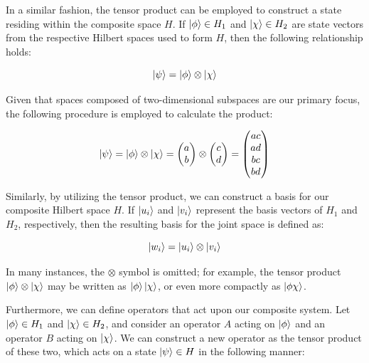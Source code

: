 \documentclass[en]{dimscthesis}
\begin{document}
In a similar fashion, the tensor product can be employed to construct a state residing within the composite space $H$. If $\ket{\phi} \in H_1$ and $\ket{\chi} \in H_2$ are state vectors from the respective Hilbert spaces used to form $H$, then the following relationship holds:

\begin{equation}
	\ket{\psi} = \ket{\phi} \otimes \ket{\chi}
	\label{eq:tensor_states}
\end{equation}

Given that spaces composed of two-dimensional subspaces are our primary focus, the following procedure is employed to calculate the product:

\begin{equation}
	\ket{\psi} = \ket{\phi} \otimes \ket{\chi} 
	= \begin{pmatrix} 
		a \\ 
		b 
	\end{pmatrix} 
	\otimes
	\begin{pmatrix} 
		c \\ 
		d
	\end{pmatrix} 
	= \begin{pmatrix} 
		ac \\ 
		ad \\
		bc \\
		bd
	\end{pmatrix}
	\label{eq:constr_states}
\end{equation}

Similarly, by utilizing the tensor product, we can construct a basis for our composite Hilbert space $H$. If $\ket{u_i}$ and $\ket{v_i}$ represent the basis vectors of $H_1$ and $H_2$, respectively, then the resulting basis for the joint space is defined as:

\begin{equation}
	\ket{w_i} = \ket{u_i} \otimes \ket{v_i}
	\label{eq:wi}
\end{equation}

In many instances, the $\otimes$ symbol is omitted; for example, the tensor product $\ket{\phi} \otimes \ket{\chi}$ may be written as $\ket{\phi} \ket{\chi}$, or even more compactly as $\ket{\phi\chi}$.

Furthermore, we can define operators that act upon our composite system. Let $\ket{\phi} \in H_1$ and $\ket{\chi} \in H_2$, and consider an operator $A$ acting on $\ket{\phi}$ and an operator $B$ acting on $\ket{\chi}$. We can construct a new operator as the tensor product of these two, which acts on a state $\ket{\psi} \in H$ in the following manner:
\end{document}
